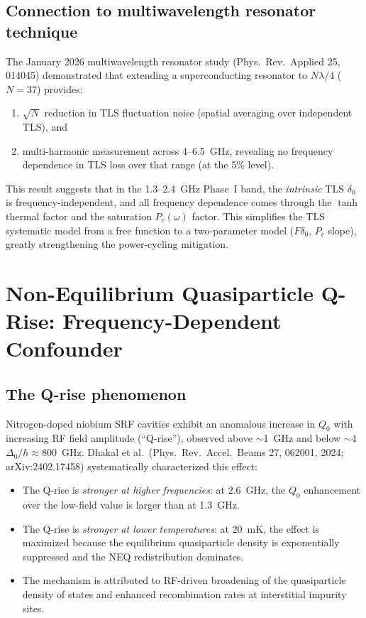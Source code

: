 \documentclass[11pt]{article}
\theoremstyle{definition}
\theoremstyle{remark}
\begin{document}
\subsection{Connection to multiwavelength resonator technique}

The January 2026 multiwavelength resonator study (Phys.\ Rev.\ Applied
25, 014045) demonstrated that extending a superconducting resonator to
$N\lambda/4$ ($N = 37$) provides:
\begin{enumerate}[nosep]
\item $\sqrt{N}$ reduction in TLS fluctuation noise (spatial averaging
  over independent TLS), and
\item multi-harmonic measurement across 4--6.5~GHz, revealing no
  frequency dependence in TLS loss over that range (at the 5\% level).
\end{enumerate}

This result suggests that in the 1.3--2.4~GHz Phase~I band, the
\emph{intrinsic} TLS $\delta_0$ is frequency-independent, and all
frequency dependence comes through the $\tanh$ thermal factor and the
saturation $P_c(\omega)$ factor. This simplifies the TLS systematic
model from a free function to a two-parameter model ($F\delta_0$, $P_c$
slope), greatly strengthening the power-cycling mitigation.


\section{Non-Equilibrium Quasiparticle Q-Rise: Frequency-Dependent Confounder}
\label{sec:neq}

\subsection{The Q-rise phenomenon}

Nitrogen-doped niobium SRF cavities exhibit an anomalous increase in
$Q_0$ with increasing RF field amplitude (``Q-rise''), observed
above $\sim$1~GHz and below $\sim$4$\Delta_0/h \approx 800$~GHz.
Dhakal et al.\ (Phys.\ Rev.\ Accel.\ Beams 27, 062001, 2024;
arXiv:2402.17458) systematically characterized this effect:

\begin{itemize}[nosep]
\item The Q-rise is \emph{stronger at higher frequencies}: at 2.6~GHz,
  the $Q_0$ enhancement over the low-field value is larger than at
  1.3~GHz.
\item The Q-rise is \emph{stronger at lower temperatures}: at 20~mK,
  the effect is maximized because the equilibrium quasiparticle density
  is exponentially suppressed and the NEQ redistribution dominates.
\item The mechanism is attributed to RF-driven broadening of the
  quasiparticle density of states and enhanced recombination rates
  at interstitial impurity sites.
\end{itemize}
\end{document}
